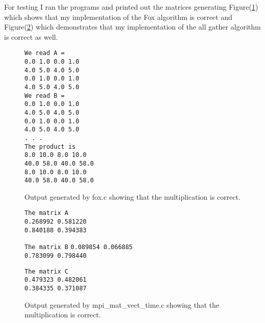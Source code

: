 \documentclass[11pt,a4paper,oneside]{report}
\begin{document}
For testing I ran the programs and printed out the matrices generating Figure(\ref{fig:fox}) which shows that my implementation of the Fox algorithm is correct and 
Figure(\ref{fig:allgather}) which demonstrates that my implementation of the all gather algorithm is correct as well.

\begin{figure}[htpb]
  \texttt{We read A =\\}
  \texttt{0.0  1.0  0.0  1.0 \\}
  \texttt{4.0  5.0  4.0  5.0 \\}
  \texttt{0.0  1.0  0.0  1.0 \\}
  \texttt{4.0  5.0  4.0  5.0 \\}
  \texttt{We read B =\\}
  \texttt{0.0  1.0  0.0  1.0 \\}
  \texttt{4.0  5.0  4.0  5.0 \\}
  \texttt{0.0  1.0  0.0  1.0 \\}
  \texttt{4.0  5.0  4.0  5.0 \\}
  \texttt{. . .\\}
  \texttt{The product is\\}
  \texttt{8.0 10.0  8.0 10.0 \\}
  \texttt{40.0 58.0 40.0 58.0 \\}
  \texttt{8.0 10.0  8.0 10.0 \\}
  \texttt{40.0 58.0 40.0 58.0 \\}
  \caption{Output generated by fox.c showing that the multiplication is correct.}
  \label{fig:fox}
\end{figure}

\begin{figure}[htpb]
  \texttt{The matrix A\\}
  \texttt{0.268992 0.581220 \\}
  \texttt{0.840188 0.394383 \\}

  \texttt{The matrix B}
  \texttt{0.089854 0.066885 \\}
  \texttt{0.783099 0.798440 \\}

  \texttt{The matrix C\\}
  \texttt{0.479323 0.482061 \\}
  \texttt{0.384335 0.371087 \\}
  \caption{Output generated by mpi\_mat\_vect\_time.c showing that the multiplication is correct.}
  \label{fig:allgather}
\end{figure}
\end{document}
